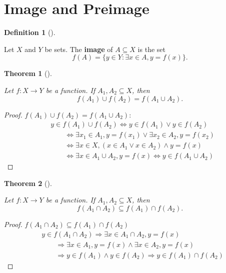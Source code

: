 \documentclass[
  letterpaper,
  10pt,
  reqno,
  twopage,
  openany]{book}
\theoremstyle{plain}
\theoremstyle{definition}
\theoremstyle{definition}
\newtheorem{definition}{Definition}[chapter]
\theoremstyle{definition}
\theoremstyle{plain}
\theoremstyle{plain}
\newtheorem{theorem}{Theorem}[chapter]
\theoremstyle{remark}
\begin{document}
\hypertarget{image-and-preimage}{%
\section{Image and Preimage}\label{image-and-preimage}}

\leavevmode{}%
\begin{definition}[]\label{def-image}

Let \(X\) and \(Y\) be sets. The  \textbf{image} of
\(A\subseteq X\) is the set
\[f(A) = \{y\in Y : \exists x\in A, y=f(x)\}.\]

\end{definition}

\leavevmode{}%
\begin{theorem}[]\label{thm-function-subseteq}

Let \(f:X\to Y\) be a function. If \(A_1, A_2\subseteq X\), then \[
f(A_1)\cup f(A_2)=f(A_1\cup A_2).
\]

\end{theorem}

\begin{proof}

\(f(A_1)\cup f(A_2)=f(A_1\cup A_2)\): \begin{align*}
& y\in f(A_1)\cup f(A_2) 
\Leftrightarrow y\in f(A_1) \lor y\in f(A_2) 
\\& \qquad 
\Leftrightarrow \exists x_1\in A_1, y=f(x_1) \lor \exists x_2\in A_2, y=f(x_2) 
\\& \qquad 
\Leftrightarrow \exists x\in X, (x\in A_1 \lor x\in A_2) \land y=f(x) 
\\& \qquad 
\Leftrightarrow \exists x \in A_1 \cup A_2, y=f(x) 
\Leftrightarrow y\in f(A_1\cup A_2) 
\end{align*}

\end{proof}

\leavevmode{}%
\begin{theorem}[]\label{thm-function-cap}

Let \(f:X\to Y\) be a function. If \(A_1, A_2\subseteq X\), then \[
f(A_1\cap A_2) \subseteq f(A_1)\cap f(A_2).
\]

\end{theorem}

\begin{proof}

\(f(A_1\cap A_2) \subseteq f(A_1)\cap f(A_2)\) \begin{align*}
& y\in f(A_1 \cap  A_2) 
\Longrightarrow \exists x\in A_1 \cap A_2, y=f(x)
\\& \qquad 
\Longrightarrow  \exists x\in A_1, y=f(x) \land \exists x\in A_2, y=f(x)
\\& \qquad 
\Longrightarrow  y\in f(A_1)\land y\in f(A_2) 
\Longrightarrow  y\in f(A_1)\cap f(A_2)
\end{align*}

\end{proof}
\end{document}
